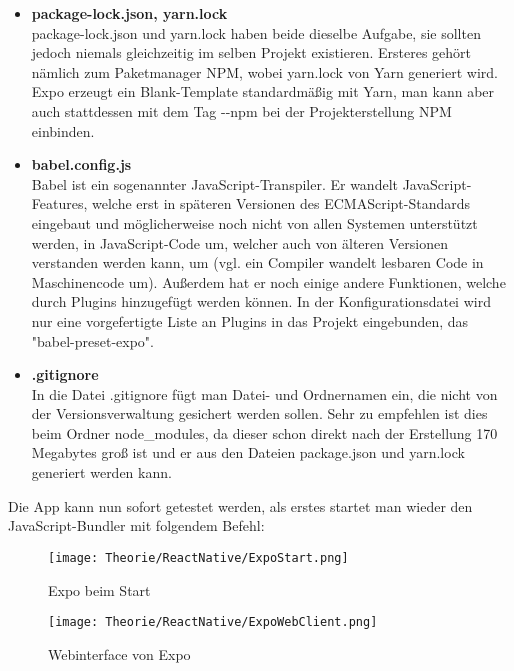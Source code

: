 \begin{itemize}
\begin{itemize}
\item \textbf{package-lock.json, yarn.lock}\\
package-lock.json und yarn.lock haben beide dieselbe Aufgabe, sie sollten jedoch niemals
gleichzeitig im selben Projekt existieren. Ersteres gehört nämlich zum Paketmanager NPM, wobei
yarn.lock von Yarn generiert wird. Expo erzeugt ein Blank-Template standardmäßig mit Yarn, man kann
aber auch stattdessen mit dem Tag -{}-npm bei der Projekterstellung NPM einbinden.

\item \textbf{babel.config.js}\\
Babel ist ein sogenannter JavaScript-Transpiler. Er wandelt JavaScript-Features, welche erst in
späteren Versionen des ECMAScript-Standards eingebaut und möglicherweise noch nicht von allen
Systemen unterstützt werden, in JavaScript-Code um, welcher auch von älteren Versionen verstanden
werden kann, um (vgl. ein Compiler wandelt lesbaren Code in Maschinencode um). Außerdem hat er noch
einige andere Funktionen, welche durch Plugins hinzugefügt werden können. In der Konfigurationsdatei
wird nur eine vorgefertigte Liste an Plugins in das Projekt eingebunden, das "babel-preset-expo".

\item \textbf{.gitignore}\\
In die Datei .gitignore fügt man Datei- und Ordnernamen ein, die nicht von der Versionsverwaltung
gesichert werden sollen. Sehr zu empfehlen ist dies beim Ordner node\_modules, da dieser schon
direkt nach der Erstellung 170 Megabytes groß ist und er aus den Dateien package.json und yarn.lock
generiert werden kann.

\end{itemize}
\end{itemize}


Die App kann nun sofort getestet werden, als erstes startet man wieder den JavaScript-Bundler
 mit folgendem Befehl:

\begin{figure}[H]
  \begin{center}
    \texttt{[image: Theorie/ReactNative/ExpoStart.png]}
    \caption{Expo beim Start}
  \end{center}
\end{figure}

\begin{figure}[H]
  \begin{center}
    \texttt{[image: Theorie/ReactNative/ExpoWebClient.png]}
    \caption{Webinterface von Expo}
  \end{center}
\end{figure}

